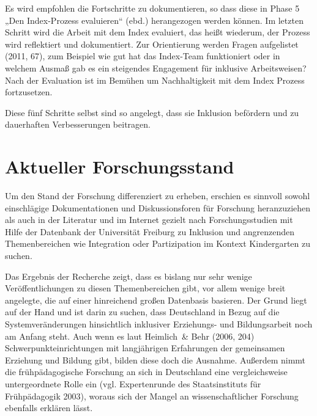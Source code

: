 Es wird empfohlen die Fortschritte zu dokumentieren, so dass diese in Phase 5 „Den Index-Prozess evaluieren“ (ebd.) herangezogen werden können. Im letzten Schritt wird die Arbeit mit dem Index evaluiert, das heißt wiederum, der Prozess wird reflektiert und dokumentiert. Zur Orientierung werden Fragen aufgelistet (2011, 67), zum Beispiel wie gut hat das Index-Team funktioniert oder in welchem Ausmaß gab es ein steigendes Engagement für inklusive Arbeitsweisen? Nach der Evaluation ist im Bemühen um Nachhaltigkeit mit dem Index Prozess fortzusetzen. 
  
Diese fünf Schritte selbst sind so angelegt, dass sie Inklusion befördern und zu dauerhaften Verbesserungen beitragen.

\section{Aktueller Forschungsstand}\label{Forschung}

Um den Stand der Forschung differenziert zu erheben, erschien es sinnvoll sowohl einschlägige Dokumentationen und Diskussionsforen für Forschung heranzuziehen als auch in der Literatur und im Internet gezielt nach Forschungsstudien mit Hilfe der Datenbank der Universität Freiburg zu Inklusion und angrenzenden Themenbereichen wie Integration oder Partizipation im Kontext Kindergarten zu suchen.

Das Ergebnis der Recherche zeigt, dass es bislang nur sehr wenige Veröffentlichungen zu diesen Themenbereichen gibt, vor allem wenige breit angelegte, die auf einer hinreichend großen Datenbasis basieren. Der Grund liegt auf der Hand und ist darin zu suchen, dass Deutschland in Bezug auf die Systemveränderungen hinsichtlich inklusiver Erziehungs- und Bildungsarbeit noch am Anfang steht. Auch wenn es laut Heimlich~\& Behr (2006, 204) Schwerpunkteinrichtungen mit langjährigen Erfahrungen der gemeinsamen Erziehung und Bildung gibt, bilden diese doch die Ausnahme.  
Außerdem nimmt die frühpädagogische Forschung an sich in Deutschland eine vergleichsweise untergeordnete Rolle ein (vgl. Expertenrunde des Staatsinstituts für Frühpädagogik 2003), woraus sich der Mangel an wissenschaftlicher Forschung ebenfalls erklären lässt. 

